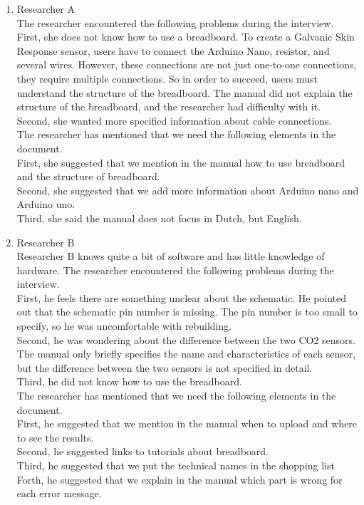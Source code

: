 \documentclass[conference]{IEEEtran}
\begin{document}
\begin{figure*}[ht]
\begin{enumerate}
				\begin{enumerate}
					\item Researcher A\\

						The researcher encountered the following problems during the interview.\\

						First, she does not know how to use a breadboard. To create a Galvanic Skin Response sensor, users have to connect the Arduino Nano, resistor, and several wires. However, these connections are not just one-to-one connections, they require multiple connections. So in order to succeed, users must understand the structure of the breadboard. The manual did not explain the structure of the breadboard, and the researcher had difficulty with it.\\
						Second, she wanted more specified information about cable connections.\\
						The researcher has mentioned that we need the following elements in the document.\\
						First, she suggested that we mention in the manual how to use breadboard and the structure of breadboard. \\
						Second, she suggested that we add more information about Arduino nano and Arduino uno.\\
						Third, she said the manual does not focus in Dutch, but English. \\		
						
					\item Researcher B\\
					Researcher B knows quite a bit of software and has little knowledge of hardware. The researcher encountered the following problems during the interview.\\
					First, he feels there are something unclear about the schematic. 						He pointed out that the schematic pin number is missing. The pin number is too small to specify, so he was uncomfortable with rebuilding.\\
					Second, he was wondering about the difference between the two CO2 sensors. The manual only briefly specifies the name and characteristics of each sensor, but the difference between the two sensors is not specified in detail.\\
					Third, he did not know how to use the breadboard.\\
					The researcher has mentioned that we need the following elements in the document.\\
					First, he suggested that we mention in the manual when to upload and where to see the results. \\
					Second, he suggested links to tutorials about breadboard.\\
					Third, he suggested that we put the technical names in the shopping list\\
					Forth, he suggested that we explain in the manual which part is wrong for each error message.\\
					

\end{enumerate}
\end{enumerate}
\end{figure*}
\end{document}
